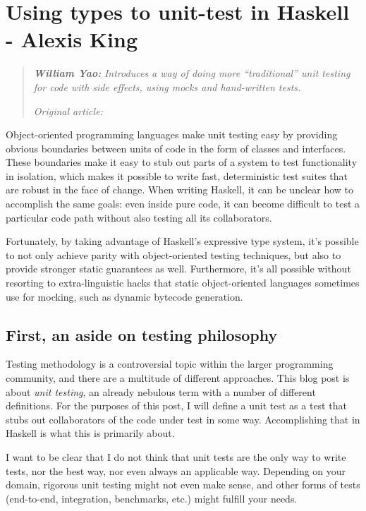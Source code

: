 \chapter{Using types to unit-test in Haskell - Alexis King}


\begin{quotation}
\noindent\textit{\textbf{William Yao:}}
\textit{Introduces a way of doing more ``traditional'' unit testing for code with side effects, using mocks and hand-written tests.}

\vspace{\baselineskip}
\noindent\textit{Original article: \cite{using_types_to_unit_test}}
\end{quotation}




Object-oriented programming languages make unit testing easy by
providing obvious boundaries between units of code in the form of
classes and interfaces. These boundaries make it easy to stub out parts
of a system to test functionality in isolation, which makes it possible
to write fast, deterministic test suites that are robust in the face of
change. When writing Haskell, it can be unclear how to accomplish the
same goals: even inside pure code, it can become difficult to test a
particular code path without also testing all its collaborators.

Fortunately, by taking advantage of Haskell's expressive type system,
it's possible to not only achieve parity with object-oriented testing
techniques, but also to provide stronger static guarantees as well.
Furthermore, it's all possible without resorting to extra-linguistic
hacks that static object-oriented languages sometimes use for mocking,
such as dynamic bytecode generation.

\section{First, an aside on testing
philosophy}\label{first-an-aside-on-testing-philosophy}

Testing methodology is a controversial topic within the larger
programming community, and there are a multitude of different
approaches. This blog post is about \emph{unit testing}, an already
nebulous term with a number of different definitions. For the purposes
of this post, I will define a unit test as a test that stubs out
collaborators of the code under test in some way. Accomplishing that in
Haskell is what this is primarily about.

I want to be clear that I do not think that unit tests are the only way
to write tests, nor the best way, nor even always an applicable way.
Depending on your domain, rigorous unit testing might not even make
sense, and other forms of tests (end-to-end, integration, benchmarks,
etc.) might fulfill your needs.

